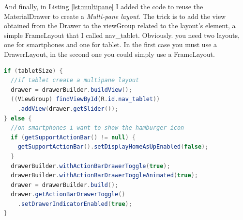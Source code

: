 And finally, in Listing \ref{lst:multipane} I added the code to reuse the \textsf{MaterialDrawer} to create a \emph{Multi-pane layout}. The trick is to add the view obtained from the \textsf{Drawer} to the \textsf{viewGroup} related to the layout's element, a simple \textsf{FrameLayout} that I called \textsf{nav\_tablet}. Obviously. you need two layouts, one for smartphones and one for tablet. In the first case you must use a \textsf{DrawerLayout}, in the second one you could simply use a \textsf{FrameLayout}.


\begin{lstlisting}[caption={Reuse Drawer for Multi-pane layout},label=lst:multipane, language=Java]
if (tabletSize) {
  //if tablet create a multipane layout
  drawer = drawerBuilder.buildView();
  ((ViewGroup) findViewById(R.id.nav_tablet))
    .addView(drawer.getSlider());
} else {
  //on smartphones i want to show the hamburger icon
  if (getSupportActionBar() != null) {
    getSupportActionBar().setDisplayHomeAsUpEnabled(false);
  }
  drawerBuilder.withActionBarDrawerToggle(true);
  drawerBuilder.withActionBarDrawerToggleAnimated(true);
  drawer = drawerBuilder.build();
  drawer.getActionBarDrawerToggle()
    .setDrawerIndicatorEnabled(true);
}
\end{lstlisting}


